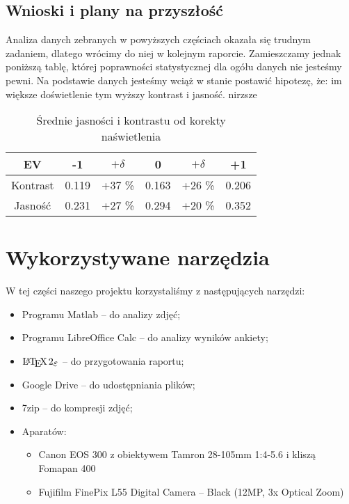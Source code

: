 \documentclass[]{mwart}
\begin{document}
\newpage
\subsection{Wnioski i plany na przyszłość}
Analiza danych zebranych w powyższych częściach okazała się trudnym zadaniem,
dlatego wrócimy do niej w kolejnym raporcie. Zamieszczamy jednak poniższą tablę,
której poprawności statystycznej dla ogółu danych nie jesteśmy pewni. Na podstawie
danych jesteśmy wciąż w stanie postawić hipotezę, że: im większe doświetlenie tym
wyższy kontrast i jasność. nirzsze


\begin{table}[h]
    \centering
    \begin{tabular}{|c|c|c|c|c|c|}
        \hline
        EV       & -1    & $+\delta$ & 0     & $+\delta$ & +1    \\ \hline
        Kontrast & 0.119 & +37 \%    & 0.163 & +26 \%    & 0.206 \\ \hline
        Jasność  & 0.231 & +27 \%    & 0.294 & +20 \%    & 0.352 \\ \hline
    \end{tabular}
    \caption{Średnie jasności i kontrastu od korekty naświetlenia}

\end{table}




\section{Wykorzystywane narzędzia}
W tej części naszego projektu korzystaliśmy z następujących narzędzi:
\begin{itemize}
    \item Programu Matlab -- do analizy zdjęć;
    \item Programu LibreOffice Calc -- do analizy wyników ankiety;
    \item $\LaTeXe{}$ -- do przygotowania raportu;
    \item Google Drive -- do udostępniania plików;
    \item 7zip -- do kompresji zdjęć;
    \item Aparatów:
          \begin{itemize}
              \item Canon EOS 300 z obiektywem Tamron 28-105mm 1:4-5.6 i kliszą Fomapan 400
              \item Fujifilm FinePix L55 Digital Camera -- Black (12MP, 3x Optical Zoom)
          \end{itemize}
\end{itemize}
\end{document}
